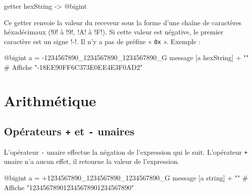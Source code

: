 \begin{galgas}
getter hexString -> @bigint
\end{galgas}

Ce getter renvoie la valeur du receveur sous la forme d'une chaîne de caractères héxadécimaux (\ggs!0! à \ggs!9!, \ggs!A! à \ggs!F!). Si cette valeur est négative, le premier caractère est un signe \ggs!-!. Il n'y a pas de préfixe « \texttt{0x} ». Exemple :

\begin{galgas}
@bigint a = -1234567890_1234567890_1234567890_G
message [a hexString] + "\n" # Affiche "-18EE90FF6C373E0EE4E3F0AD2"
\end{galgas}









\section{Arithmétique}

\subsection{Opérateurs \texttt{+} et \texttt{-} unaires}

L'opérateur \texttt{-} unaire effectue la négation de l'expression qui le suit. L'opérateur \texttt{+} unaire n'a aucun effet, il retourne la valeur de l'expression.

\begin{galgas}
@bigint a = +1234567890_1234567890_1234567890_G
message [a string] + "\n" # Affiche "123456789012345678901234567890"
\end{galgas}


